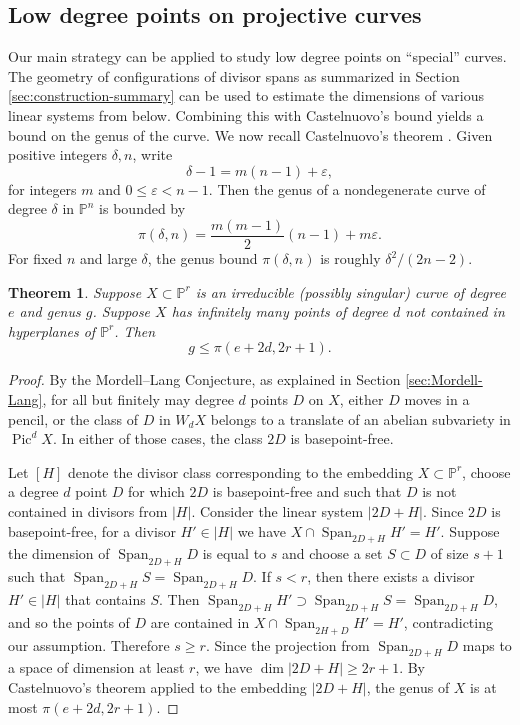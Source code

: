 \documentclass[11pt]{amsart}
\newcommand{\PP}{\mathbb{P}}
\DeclareMathOperator{\Pic}{Pic}
\newcommand{\Span}{\operatorname{Span}}
\newtheorem{theorem}{Theorem}[section]
\theoremstyle{definition}
\theoremstyle{remark}
\begin{document}
\subsection{Low degree points on projective curves}\label{sec:special-curves}
Our main strategy can be applied to study low degree points on  ``special'' curves. The geometry of configurations of divisor spans as summarized in Section \ref{sec:construction-summary} can be used to estimate the dimensions of various linear systems from below. Combining this with Castelnuovo's bound yields a bound on the genus of the curve. We now recall Castelnuovo's theorem \cite[Chapter III, page 116]{ACGH}. Given positive integers $\delta , n$, write
\[\delta-1 = m (n-1) + \varepsilon,\] for  integers $m$ and $0 \leqslant \varepsilon < n-1.$ Then the genus of a nondegenerate curve of degree $\delta$ in $\PP^n$ is bounded by \[\pi(\delta,n) = \frac{m(m-1)}{2}(n-1) + m\varepsilon.\] For fixed $n$ and large $\delta$, the genus bound \(\pi(\delta, n)\) is roughly $\delta^2/(2n-2)$. 
\begin{theorem}\label{thms:special-curves}
Suppose $X \subset \PP^r$ is an irreducible (possibly singular) curve of degree $e$ and genus $g$. Suppose $X$ has infinitely many points of degree $d$ not contained in hyperplanes of $\PP^r$. Then 
\[g \leqslant \pi(e+2d, 2r+1).\]
\end{theorem}
\begin{proof}
By the Mordell--Lang Conjecture, as explained in Section \ref{sec:Mordell-Lang},
for all but finitely may degree $d$ points $D$ on $X$, either $D$ moves in a pencil, or the class of $D$ in $W_dX$ belongs to a translate of an abelian subvariety in $\Pic^d X$. In either of those cases, the class $2D$ is basepoint-free.

Let $[H]$ denote the divisor class corresponding to the embedding $X \subset \PP^r$, choose a degree $d$ point $D$ for which $2D$ is basepoint-free and such that $D$ is not contained in divisors from $|H|$. Consider the linear system $|2D+H|$. Since $2D$ is basepoint-free, for a divisor $H' \in |H|$ we have $X \cap \Span_{2D+H} H'=H'$. Suppose the dimension of $\Span_{2D + H} D$ is equal to $s$ and choose a set $S \subset D$ of size $s+1$ such that $\Span_{2D+H} S = \Span_{2D+H} D$. If $s<r$, then there exists a divisor $H' \in |H|$ that contains $S$. Then $\Span_{2D+H} H'\supset \Span_{2D+H} S = \Span_{2D+H} D$, and so the points of $D$ are contained in \(X \cap \Span_{2H + D}H'=H'\), contradicting our assumption. Therefore $s\geqslant r$. Since the projection from $\Span_{2D+H} D$ maps to a space of dimension at least $r$, we have $\dim |2D+H| \geqslant 2r+1.$ By Castelnuovo's theorem applied to the embedding $|2D+H|$, the genus of $X$ is at most $\pi(e+2d, 2r+1)$.
\end{proof}
\end{document}
